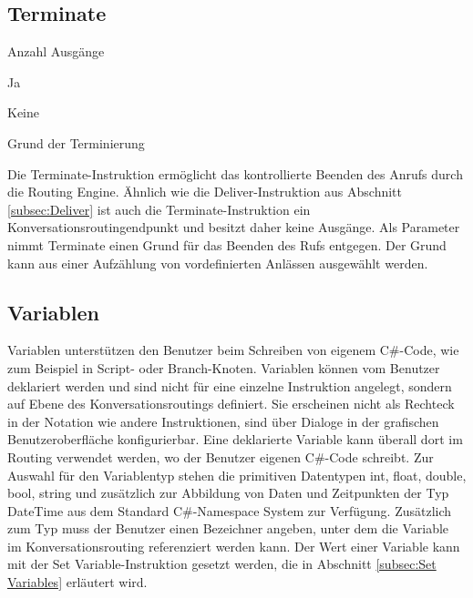 \subsection{Terminate}
\begin{labeling}{Anzahl Ausgänge}
\item [Eingang] Ja
\item [Anzahl Ausgänge] Keine
\item [Parameter] Grund der Terminierung
\item [Beschreibung] Die Terminate-Instruktion ermöglicht das kontrollierte Beenden des Anrufs durch die Routing Engine. Ähnlich wie die Deliver-Instruktion aus Abschnitt \ref{subsec:Deliver} ist auch die Terminate-Instruktion ein Konversationsroutingendpunkt und besitzt daher keine Ausgänge. Als Parameter nimmt Terminate einen Grund für das Beenden des Rufs entgegen. Der Grund kann aus einer Aufzählung von vordefinierten Anlässen ausgewählt werden.
\end{labeling}

\subsection{Variablen}
\label{subsec:Variablen}
Variablen unterstützen den Benutzer beim Schreiben von eigenem C\#-Code, wie zum Beispiel in Script- oder Branch-Knoten. Variablen können vom Benutzer deklariert werden und sind nicht für eine einzelne Instruktion angelegt, sondern auf Ebene des Konversationsroutings definiert. Sie erscheinen nicht als Rechteck in der Notation wie andere Instruktionen, sind über Dialoge in der grafischen Benutzeroberfläche konfigurierbar. Eine deklarierte Variable kann überall dort im Routing verwendet werden, wo der Benutzer eigenen C\#-Code schreibt. Zur Auswahl für den Variablentyp stehen die primitiven Datentypen int, float, double, bool, string und zusätzlich zur Abbildung von Daten und Zeitpunkten der Typ DateTime aus dem Standard C\#-Namespace System zur Verfügung. Zusätzlich zum Typ muss der Benutzer einen Bezeichner angeben, unter dem die Variable im Konversationsrouting referenziert werden kann. Der Wert einer Variable kann mit der Set Variable-Instruktion gesetzt werden, die in Abschnitt \ref{subsec:Set Variables} erläutert wird. 

